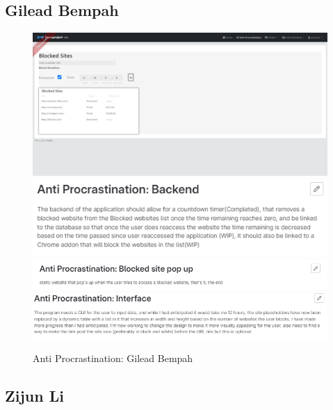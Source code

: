 \documentclass[a4paper]{article}
\begin{document}
\subsection{Gilead Bempah}

\begin{figure}[H]
	\centering
	\includegraphics[width=1\textwidth]{./images/Anti.png}
	\includegraphics[width=1\textwidth]{./images/Anti_Backend.png}
	\includegraphics[width=1\textwidth]{./images/Anti_Block_site.png}
	\includegraphics[width=1\textwidth]{./images/Anti_Interface.png}
	\caption*{Anti Procrastination: Gilead Bempah}
	\label{Fig.Anti_Procrastination}
\end{figure}

\subsection{Zijun Li}
\end{document}
